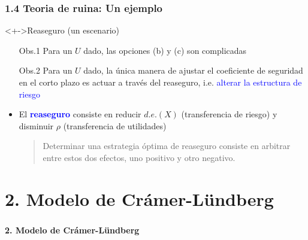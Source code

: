 \documentclass[cjk,t,compress]{beamer}
\begin{document}
\begin{frame}[fragile]
	\frametitle{1.4 Teoria de ruina: Un ejemplo}
	\scriptsize  	
		
		\vspace{0.1cm}
		\begin{block}<+->{Reaseguro (un escenario)}
		\vspace{0.1cm}
		\begin{itemize}
		  \item[Obs.1] Para un $U$ dado, las opciones (b) y (c) son complicadas
		  \item[Obs.2] Para un $U$ dado, la \'unica manera de ajustar el coeficiente de seguridad en el corto plazo es actuar a trav\'es del reaseguro, i.e. \textcolor{blue}{alterar la estructura de riesgo} 
		  \item El \textcolor{blue}{\bf reaseguro} consiste en reducir $d.e.(X)$ (transferencia de riesgo) y disminuir $\rho$ (transferencia de utilidades) 
		  \begin{quote}
		  Determinar una estrategia \'optima de reaseguro consiste en arbitrar entre estos dos efectos, uno positivo y otro negativo.
		  \end{quote}
		\end{itemize}
		\end{block}
		
\end{frame}

%
%
\section{2. Modelo de Cr\'amer-L\"undberg}
\begin{frame}[fragile]
\frametitle{}
\vspace{5.5cm}
\begin{flushright}
	\textcolor{MyDarkBlue}{\Large \bf 2. Modelo de Cr\'amer-L\"undberg}
\end{flushright}
\end{frame}

%
%
\end{document}
